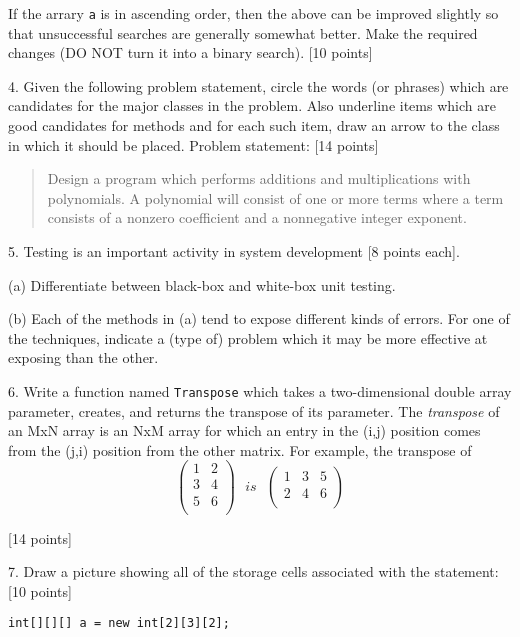 If the arrary {\tt a} is in ascending order, then
the above can be improved slightly so that 
unsuccessful searches are generally somewhat better.
Make the required changes (DO NOT turn it into
a binary search). [10 points]



4. Given the following problem statement, circle the words
(or phrases) which are candidates for the major classes
in the problem.  Also underline items which
are good candidates for methods and for each such item,
draw an arrow to the class in which it should be placed.
Problem statement: [14 points]

\begin{quote}

Design a program which performs additions and multiplications
with polynomials.  A polynomial will consist of one or
more terms where a term consists of a nonzero coefficient
and a nonnegative integer exponent.

\end{quote}

5. Testing is an important activity in system development [8 points each].

(a) Differentiate between black-box and white-box unit testing.

(b)  Each of the methods in (a) tend to expose different
kinds of errors.  For one of the techniques, indicate a 
(type of) problem which it 
may be more effective at exposing than the other.  


6. Write a function named {\tt Transpose} which takes a two-dimensional
double array
parameter, creates,  and returns the transpose of its
parameter.  The {\em transpose} of an MxN array is
an NxM array for which an entry in the (i,j) position comes
from the (j,i) position from the other matrix.  For example,
the transpose of
\[ \left (
\begin{array}{cc}
1 & 2\\
3 & 4\\
5 & 6\\
\end{array}
\right )
\ \ \ is\ \ \
 \left (
 \begin{array}{ccc}
 1 & 3 & 5\\
 2 & 4 & 6\\
 \end{array}
 \right ) \]

 [14 points]


 7.  Draw a picture showing all of the storage cells associated with
 the statement: [10 points]

 {\tt int[][][] a = new int[2][3][2];}
 


